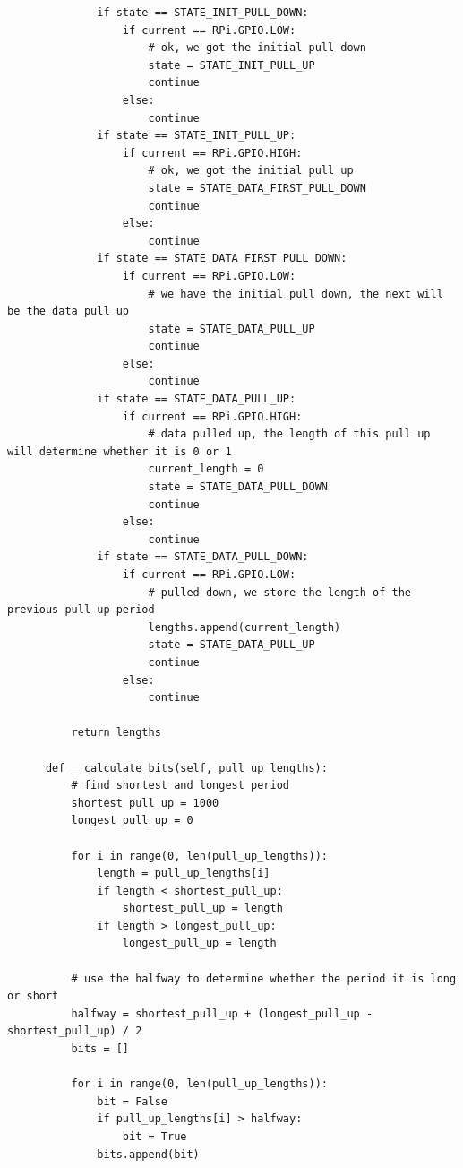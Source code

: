 \documentclass[10pt,a4paper]{article}
\begin{document}
\begin{verbatim}
              if state == STATE_INIT_PULL_DOWN:
                  if current == RPi.GPIO.LOW:
                      # ok, we got the initial pull down
                      state = STATE_INIT_PULL_UP
                      continue
                  else:
                      continue
              if state == STATE_INIT_PULL_UP:
                  if current == RPi.GPIO.HIGH:
                      # ok, we got the initial pull up
                      state = STATE_DATA_FIRST_PULL_DOWN
                      continue
                  else:
                      continue
              if state == STATE_DATA_FIRST_PULL_DOWN:
                  if current == RPi.GPIO.LOW:
                      # we have the initial pull down, the next will be the data pull up
                      state = STATE_DATA_PULL_UP
                      continue
                  else:
                      continue
              if state == STATE_DATA_PULL_UP:
                  if current == RPi.GPIO.HIGH:
                      # data pulled up, the length of this pull up will determine whether it is 0 or 1
                      current_length = 0
                      state = STATE_DATA_PULL_DOWN
                      continue
                  else:
                      continue
              if state == STATE_DATA_PULL_DOWN:
                  if current == RPi.GPIO.LOW:
                      # pulled down, we store the length of the previous pull up period
                      lengths.append(current_length)
                      state = STATE_DATA_PULL_UP
                      continue
                  else:
                      continue

          return lengths

      def __calculate_bits(self, pull_up_lengths):
          # find shortest and longest period
          shortest_pull_up = 1000
          longest_pull_up = 0

          for i in range(0, len(pull_up_lengths)):
              length = pull_up_lengths[i]
              if length < shortest_pull_up:
                  shortest_pull_up = length
              if length > longest_pull_up:
                  longest_pull_up = length

          # use the halfway to determine whether the period it is long or short
          halfway = shortest_pull_up + (longest_pull_up - shortest_pull_up) / 2
          bits = []

          for i in range(0, len(pull_up_lengths)):
              bit = False
              if pull_up_lengths[i] > halfway:
                  bit = True
              bits.append(bit)


\end{verbatim}
\end{document}
